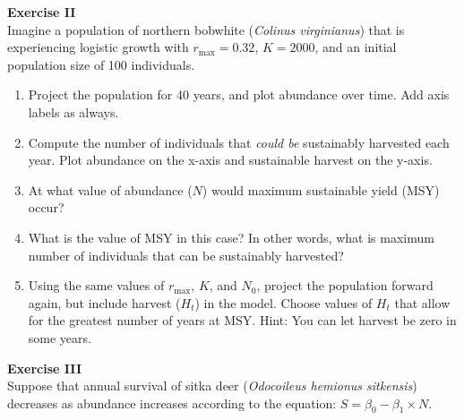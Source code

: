 \documentclass[12pt]{article}\usepackage[]{graphicx}\usepackage[]{xcolor}
\begin{document}
{\bf Exercise II \\}
Imagine a population of northern bobwhite ({\it Colinus virginianus})
that is experiencing logistic growth with $r_\mathrm{max} = 0.32$, $K = 2000$,
and an initial population size of 100 individuals.
\begin{enumerate}
  \item Project the population for 40 years, and plot abundance over
    time. Add axis labels as always.
  \item Compute the number of individuals that {\it could be} sustainably
    harvested each year. Plot abundance on the x-axis and sustainable
    harvest on the y-axis.
  \item At what value of abundance ($N$) would maximum sustainable yield (MSY) occur?
  \item What is the value of MSY in this case? In other words, what is
    maximum number of individuals that can be sustainably harvested? 
  \item Using the same values of $r_\mathrm{max}$, $K$, and $N_0$, project the population
    forward again, but include harvest ($H_t$) in the model. Choose values of $H_t$ that
    allow for the greatest number of years at MSY. Hint: You can let
    harvest be zero in some years.
\end{enumerate}

\vspace{12pt}



{\bf Exercise III \\}
Suppose that annual survival of sitka deer ({\it Odocoileus hemionus
  sitkensis}) decreases as abundance increases according to the
equation: $S = \beta_0 - \beta_1 \times N$.
\end{document}

